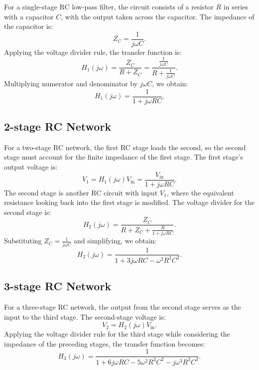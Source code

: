 \documentclass[a4paper,12pt]{article}
\begin{document}
For a single-stage RC low-pass filter, the circuit consists of a resistor \( R \) in series with a capacitor \( C \), with the output taken across the capacitor. The impedance of the capacitor is:
\[
Z_C = \frac{1}{j\omega C}.
\]
Applying the voltage divider rule, the transfer function is:
\[
H_1(j\omega) = \frac{Z_C}{R + Z_C} = \frac{\frac{1}{j\omega C}}{R + \frac{1}{j\omega C}}.
\]
Multiplying numerator and denominator by \( j\omega C \), we obtain:
\[
H_1(j\omega) = \frac{1}{1 + j\omega RC}.
\]

\subsection{2-stage RC Network}

For a two-stage RC network, the first RC stage loads the second, so the second stage must account for the finite impedance of the first stage. The first stage's output voltage is:
\[
V_1 = H_1(j\omega) V_{\text{in}} = \frac{V_{\text{in}}}{1 + j\omega RC}.
\]
The second stage is another RC circuit with input \( V_1 \), where the equivalent resistance looking back into the first stage is modified. The voltage divider for the second stage is:
\[
H_2(j\omega) = \frac{Z_C}{R + Z_C + \frac{R}{1 + j\omega RC}}.
\]
Substituting \( Z_C = \frac{1}{j\omega C} \) and simplifying, we obtain:
\[
H_2(j\omega) = \frac{1}{1 + 3j\omega RC - \omega^2 R^2C^2}.
\]

\subsection{3-stage RC Network}

For a three-stage RC network, the output from the second stage serves as the input to the third stage. The second-stage voltage is:
\[
V_2 = H_2(j\omega) V_{\text{in}}.
\]
Applying the voltage divider rule for the third stage while considering the impedance of the preceding stages, the transfer function becomes:
\[
H_3(j\omega) = \frac{1}{1 + 6j\omega RC - 5\omega^2 R^2C^2 - j\omega^3 R^3C^3}.
\]
\end{document}
